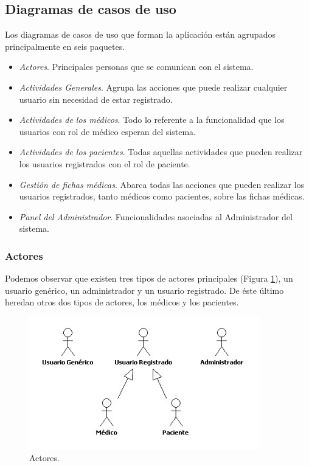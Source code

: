	
	\subsection{Diagramas de casos de uso} %
	\label{sub:diagramas_de_casos_de_uso}
	
		Los diagramas de casos de uso que forman la aplicación están agrupados principalmente en seis paquetes.
		\begin{itemize}
			\item \textit{Actores}. Principales personas que se comunican con el sistema.
			\item \textit{Actividades Generales}. Agrupa las acciones que puede realizar cualquier usuario sin necesidad de estar registrado.
			\item \textit{Actividades de los médicos}. Todo lo referente a la funcionalidad que los usuarios con rol de médico esperan del sistema.
			\item \textit{Actividades de los pacientes}. Todas aquellas actividades que pueden realizar los usuarios registrados con el rol de paciente.
			\item \textit{Gestión de fichas médicas}. Abarca todas las acciones que pueden realizar los usuarios registrados, tanto médicos como pacientes, sobre las fichas médicas.
			\item \textit{Panel del Administrador}. Funcionalidades asociadas al Administrador del sistema.
		\end{itemize}
	
	
		\subsubsection{Actores} %
		\label{sec:actores}
			Podemos observar que existen tres tipos de actores principales (Figura \ref{fig:actores}), un usuario genérico, un administrador y un usuario registrado. De éste último heredan otros dos tipos de actores, los médicos y los pacientes.
			\begin{figure}[H]
			  \centering
			    \includegraphics[width=10cm]{img/jpg/casos_uso/Actores.jpg}
			  \caption{Actores.}
			  \label{fig:actores}
			\end{figure}
			
